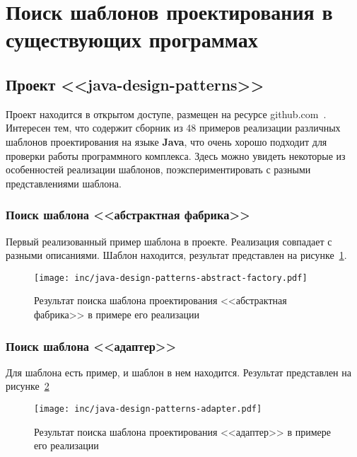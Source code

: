 \section{Поиск шаблонов проектирования в существующих программах}

\subsection*{Проект <<java-design-patterns>>}

Проект находится в открытом доступе, размещен на ресурсе
github.com~\cite{java-design-patterns}.
Интересен тем, что содержит сборник из 48 примеров реализации различных
шаблонов проектирования на языке \textbf{Java},
что очень хорошо подходит для проверки работы программного комплекса.
Здесь можно увидеть некоторые из особенностей реализации шаблонов,
поэкспериментировать с разными представлениями шаблона.

\subsubsection*{Поиск шаблона <<абстрактная фабрика>>}

Первый реализованный пример шаблона в проекте.
Реализация совпадает с разными описаниями.
Шаблон находится, результат представлен на рисунке~\ref{fig:java-design-patterns-abstract-factory}.

\begin{figure}[!ht]
\centering
\texttt{[image: inc/java-design-patterns-abstract-factory.pdf]}
\caption{Результат поиска шаблона проектирования <<абстрактная фабрика>> в примере его реализации}
\label{fig:java-design-patterns-abstract-factory}
\end{figure}

\subsubsection*{Поиск шаблона <<адаптер>>}

Для шаблона есть пример, и шаблон в нем находится.
Результат представлен на рисунке~\ref{fig:java-design-patterns-adapter}

\begin{figure}[!ht]
\centering
\texttt{[image: inc/java-design-patterns-adapter.pdf]}
\caption{Результат поиска шаблона проектирования <<адаптер>> в примере его реализации}
\label{fig:java-design-patterns-adapter}
\end{figure}


